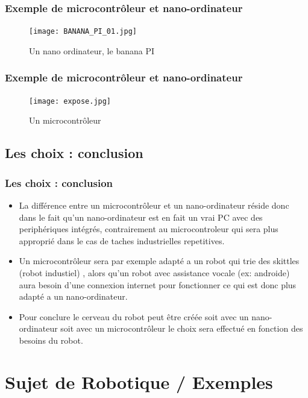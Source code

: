 \documentclass{beamer}
\begin{document}
\begin{frame}
\frametitle{Exemple de microcontrôleur et nano-ordinateur}
\begin{figure}[!h]
\centering
\texttt{[image: BANANA\_PI\_01.jpg]}
\caption{Un nano ordinateur, le banana PI}
\end{figure}
\end{frame}
\begin{frame}
\frametitle{Exemple de microcontrôleur et nano-ordinateur}
\begin{figure}[!h]
\centering
\texttt{[image: expose.jpg]}
\caption{Un microcontrôleur}
\end{figure}
\end{frame}
\subsection{Les choix : conclusion}
\begin{frame}
\frametitle{Les choix : conclusion}
\begin{itemize}
    \item La différence entre un microcontrôleur et un nano-ordinateur réside donc dans le fait qu'un nano-ordinateur est en fait un vrai PC avec  des periphériques intégrés, contrairement au microcontroleur qui sera plus approprié dans le cas de taches industrielles repetitives.
  \item Un microcontrôleur sera par exemple adapté a un robot qui trie des skittles (robot industiel) , alors qu'un robot avec assistance vocale (ex: androide) aura besoin d'une connexion internet pour fonctionner ce qui est donc plus adapté a un nano-ordinateur.
\item Pour conclure le cerveau du robot peut être créée soit avec un nano-ordinateur soit avec un microcontrôleur le choix sera effectué en fonction des besoins du robot.
\end{itemize}
\end{frame}

\section{Sujet de Robotique / Exemples}
\end{document}
